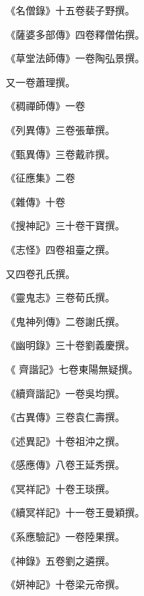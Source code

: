 \begin{pinyinscope}
 《名僧錄》十五卷裴子野撰。



 《薩婆多部傳》四卷釋僧佑撰。



 《草堂法師傳》一卷陶弘景撰。



 又一卷蕭理撰。



 《稠禪師傳》一卷



 《列異傳》三卷張華撰。



 《甄異傳》三卷戴祚撰。



 《征應集》二卷



 《雜傳》十卷



 《搜神記》三十卷干寶撰。



 《志怪》四卷祖臺之撰。



 又四卷孔氏撰。



 《靈鬼志》三卷荀氏撰。



 《鬼神列傳》二卷謝氏撰。



 《幽明錄》三十卷劉義慶撰。



 《
 齊諧記》七卷東陽無疑撰。



 《續齊諧記》一卷吳均撰。



 《古異傳》三卷袁仁壽撰。



 《述異記》十卷祖沖之撰。



 《感應傳》八卷王延秀撰。



 《冥祥記》十卷王琰撰。



 《續冥祥記》十一卷王曼穎撰。



 《系應驗記》一卷陸果撰。



 《神錄》五卷劉之遴撰。



 《妍神記》十卷梁元帝撰。




\end{pinyinscope}
